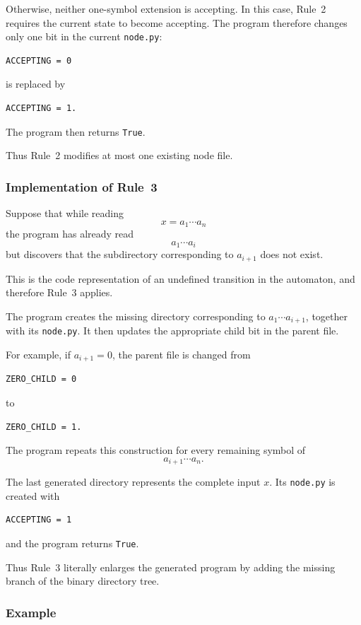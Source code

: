 \documentclass[11pt]{article}
\begin{document}
Otherwise, neither one-symbol extension is accepting.  In this case,
Rule~2 requires the current state to become accepting.  The program
therefore changes only one bit in the current \texttt{node.py}:
\begin{verbatim}
ACCEPTING = 0
\end{verbatim}
is replaced by
\begin{verbatim}
ACCEPTING = 1.
\end{verbatim}
The program then returns \texttt{True}.

Thus Rule~2 modifies at most one existing node file.

\subsubsection*{Implementation of Rule~3}

Suppose that while reading
\[
x=a_1\cdots a_n
\]
the program has already read
\[
a_1\cdots a_i
\]
but discovers that the subdirectory corresponding to \(a_{i+1}\) does not
exist.

This is the code representation of an undefined transition in the
automaton, and therefore Rule~3 applies.

The program creates the missing directory corresponding to
\(a_1\cdots a_{i+1}\), together with its \texttt{node.py}.  It then updates
the appropriate child bit in the parent file.

For example, if \(a_{i+1}=0\), the parent file is changed from
\begin{verbatim}
ZERO_CHILD = 0
\end{verbatim}
to
\begin{verbatim}
ZERO_CHILD = 1.
\end{verbatim}

The program repeats this construction for every remaining symbol of
\[
a_{i+1}\cdots a_n.
\]

The last generated directory represents the complete input \(x\).  Its
\texttt{node.py} is created with
\begin{verbatim}
ACCEPTING = 1
\end{verbatim}
and the program returns \texttt{True}.

Thus Rule~3 literally enlarges the generated program by adding the missing
branch of the binary directory tree.

\subsubsection*{Example}
\end{document}
